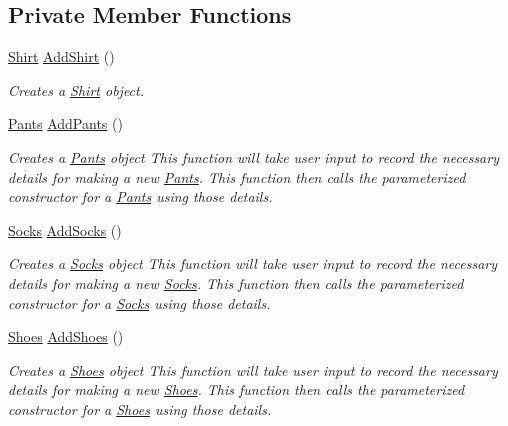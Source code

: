 \subsection*{Private Member Functions}
\begin{DoxyCompactItemize}
\item 
\mbox{\hyperlink{classShirt}{Shirt}} \mbox{\hyperlink{classCloset_aba3296cf8964b43f64911cc69c56cbfd}{Add\+Shirt}} ()
\begin{DoxyCompactList}\small\item\em Creates a \textquotesingle{}\mbox{\hyperlink{classShirt}{Shirt}}\textquotesingle{} object. \end{DoxyCompactList}\item 
\mbox{\hyperlink{classPants}{Pants}} \mbox{\hyperlink{classCloset_a86001d9aab63ec5cca05bb2daa67e755}{Add\+Pants}} ()
\begin{DoxyCompactList}\small\item\em Creates a \textquotesingle{}\mbox{\hyperlink{classPants}{Pants}}\textquotesingle{} object  This function will take user input to record the necessary details for making a new \textquotesingle{}\mbox{\hyperlink{classPants}{Pants}}\textquotesingle{}. This function then calls the parameterized constructor for a \textquotesingle{}\mbox{\hyperlink{classPants}{Pants}}\textquotesingle{} using those details. \end{DoxyCompactList}\item 
\mbox{\hyperlink{classSocks}{Socks}} \mbox{\hyperlink{classCloset_aac44ecf78525b3e0ac4ed80af2133186}{Add\+Socks}} ()
\begin{DoxyCompactList}\small\item\em Creates a \textquotesingle{}\mbox{\hyperlink{classSocks}{Socks}}\textquotesingle{} object  This function will take user input to record the necessary details for making a new \textquotesingle{}\mbox{\hyperlink{classSocks}{Socks}}\textquotesingle{}. This function then calls the parameterized constructor for a \textquotesingle{}\mbox{\hyperlink{classSocks}{Socks}}\textquotesingle{} using those details. \end{DoxyCompactList}\item 
\mbox{\hyperlink{classShoes}{Shoes}} \mbox{\hyperlink{classCloset_a489badac5a919460e8cc8e216f8b3eac}{Add\+Shoes}} ()
\begin{DoxyCompactList}\small\item\em Creates a \textquotesingle{}\mbox{\hyperlink{classShoes}{Shoes}}\textquotesingle{} object  This function will take user input to record the necessary details for making a new \textquotesingle{}\mbox{\hyperlink{classShoes}{Shoes}}\textquotesingle{}. This function then calls the parameterized constructor for a \textquotesingle{}\mbox{\hyperlink{classShoes}{Shoes}}\textquotesingle{} using those details. \end{DoxyCompactList}\item 

\end{DoxyCompactItemize}

